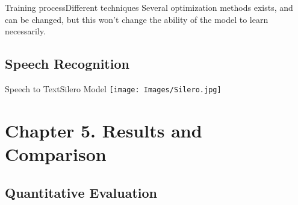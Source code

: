 \documentclass{beamer}
\begin{document}
\begin{frame}{Training process}{Different techniques}
  Several optimization methods exists, and can be changed, but this won't
  change the ability of the model to learn necessarily.
\end{frame}


\subsection{Speech Recognition}

\begin{frame}{Speech to Text}{Silero Model}
  \centering
  \texttt{[image: Images/Silero.jpg]}
\end{frame}



\section{Chapter 5. Results and Comparison}

\subsection{Quantitative Evaluation}
\end{document}
